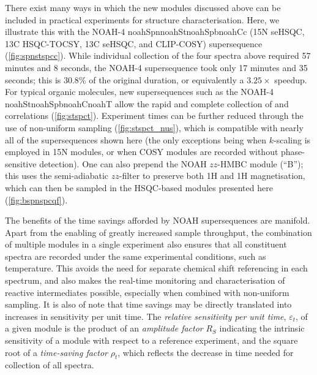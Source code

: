 \documentclass[11pt]{article}
\newcommand*{\noahfour}[4]{\csname noah#1\endcsname\csname noah#2\endcsname\csname noah#3\endcsname\csname noah#4\endcsname}
\newcommand*{\noahB}{B}
\newcommand*{\carbon}{13C}
\newcommand*{\nitrogen}{15N}
\newcommand*{\magn}[1]{1H#1}
\begin{document}
\begin{refsection}
There exist many ways in which the new modules discussed above can be included in practical experiments for structure characterisation.
Here, we illustrate this with the NOAH-4 \noahfour{Spn}{St}{Spb}{Cc} (\nitrogen{} seHSQC, \carbon{} HSQC-TOCSY, \carbon{} seHSQC, and CLIP-COSY) supersequence (\cref{fig:spnstspcc}).
While individual collection of the four spectra above required 57 minutes and 8 seconds, the NOAH-4 supersequence took only 17 minutes and 35 seconds; this is $30.8\%$ of the original duration, or equivalently a $3.25\times$ speedup.
For typical organic molecules, new supersequences such as the NOAH-4 \noahfour{St}{Spb}{C}{T} allow the rapid and complete collection of  and  correlations (\cref{fig:stspct}).
Experiment times can be further reduced through the use of non-uniform sampling\autocite{nus} (\cref{fig:stspct_nus}), which is compatible with nearly all of the supersequences shown here (the only exceptions being when $k$-scaling is employed in \nitrogen{} modules, or when COSY modules are recorded without phase-sensitive detection).
One can also prepend the NOAH $zz$-HMBC module (``\noahB{}'');\autocite{Kupce2019JMR} this uses the semi-adiabatic $zz$-filter to preserve both \magn{} and \magn{} magnetisation, which can then be sampled in the HSQC-based modules presented here (\cref{fig:bspnspcqf}).

The benefits of the time savings afforded by NOAH supersequences are manifold.
Apart from the enabling of greatly increased sample throughput, the combination of multiple modules in a single experiment also ensures that all constituent spectra are recorded under the same experimental conditions, such as temperature.
This avoids the need for separate chemical shift referencing in each spectrum, and also makes the real-time monitoring and characterisation of reactive intermediates possible, especially when combined with non-uniform sampling.
It is also of note that time savings may be directly translated into increases in sensitivity per unit time.
The \textit{relative sensitivity per unit time}, $\varepsilon_t$, of a given module is the product of an \textit{amplitude factor} $R_S$ indicating the intrinsic sensitivity of a module with respect to a reference experiment, and the square root of a \textit{time-saving factor} $\rho_t$, which reflects the decrease in time needed for collection of all spectra.


\end{refsection}
\end{document}
